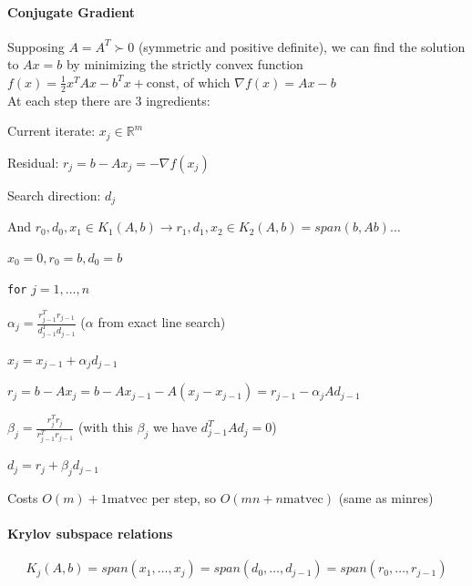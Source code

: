 \documentclass[10pt]{report}
\begin{document}
\paragraph{Conjugate Gradient} Supposing $A=A^T \succ 0$ (symmetric and positive definite), we can find the solution to $Ax = b$ by minimizing the strictly convex function $f(x) = \frac{1}{2}x^TAx-b^Tx + \text{const}$, of which $\nabla f(x) = Ax-b$\\
At each step there are 3 ingredients:
\begin{list}{}{}
	\item Current iterate: $x_j\in \mathbb{R}^m$
	\item Residual: $r_j = b-Ax_j = -\nabla f(x_j)$ 
	\item Search direction: $d_j$
\end{list}
And $r_0,d_0,x_1\in K_1(A,b) \rightarrow r_1,d_1,x_2\in K_2(A,b)=span(b,Ab)\ldots$
\begin{list}{}{}
	\item $x_0=0, r_0=b, d_0=b$
	\item \texttt{for} $j=1,\ldots,n$
	\begin{list}{}{}
		\item $\alpha_j = \frac{r^T_{j-1}r_{j-1}}{d^T_{j-1}d_{j-1}}$ ($\alpha$ from exact line search)
		\item $x_j = x_{j-1}+\alpha_jd_{j-1}$
		\item $r_j = b-Ax_j = b-Ax_{j-1}-A(x_j-x_{j-1}) = r_{j-1}-\alpha_jAd_{j-1}$
		\item $\beta_j=\frac{r_j^Tr_j}{r_{j-1}^Tr_{j-1}}$ (with this $\beta_j$ we have $d_{j-1}^TAd_j=0$)
		\item $d_j = r_j+\beta_jd_{j-1}$
	\end{list}
\end{list}
Costs $O(m)+ 1\text{matvec}$ per step, so $O(mn+n\text{matvec})$ (same as minres)
\paragraph{Krylov subspace relations} $$K_j(A,b) = span(x_1,\ldots,x_j) = span(d_0,\ldots,d_{j-1}) = span(r_0,\ldots,r_{j-1})$$
\end{document}
